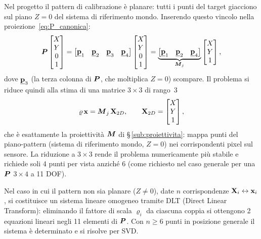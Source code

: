 Nel progetto il pattern di calibrazione è planare: tutti i punti del
target giacciono sul piano \(Z=0\) del sistema di riferimento mondo.
Inserendo questo vincolo nella proiezione~\eqref{eq:P_canonica}:
\[
  \boldsymbol{P}
  \begin{bmatrix} X \\ Y \\ 0 \\ 1 \end{bmatrix}
  =
  \begin{bmatrix} \underline{\mathbf{p}}_1 & \underline{\mathbf{p}}_2 & \underline{\mathbf{p}}_3 & \underline{\mathbf{p}}_4 \end{bmatrix}
  \begin{bmatrix} X \\ Y \\ 0 \\ 1 \end{bmatrix}
  =
  \underbrace{\begin{bmatrix} \underline{\mathbf{p}}_1 & \underline{\mathbf{p}}_2 & \underline{\mathbf{p}}_4 \end{bmatrix}}_{\boldsymbol{M}_j}
  \begin{bmatrix} X \\ Y \\ 1 \end{bmatrix},
\]
dove \(\underline{\mathbf{p}}_3\) (la terza colonna di \(\boldsymbol{P}\), che moltiplica
\(Z=0\)) scompare. Il problema si riduce quindi alla stima di
una matrice \(3\times3\) di rango~3
\[
  \varrho\,\mathbf{x} = \boldsymbol{M}_j\,\mathbf{X}_{2D},
  \qquad
  \mathbf{X}_{2D} = \begin{bmatrix} X \\ Y \\ 1 \end{bmatrix},
\]
che è esattamente la proiettività \(\boldsymbol{M}\) di
\S\,\ref{sub:proiettivita}: mappa punti del piano-pattern
(sistema di riferimento mondo, \(Z=0\)) nei corrispondenti pixel
sul sensore. La riduzione a \(3\times3\) rende il problema
numericamente più stabile e richiede soli 4 punti per vista
anziché 6 (come richiesto nel caso generale per una \(\boldsymbol{P}\)
\(3\times4\) a 11 DOF).

\begin{oss}
Nel caso in cui il pattern non sia planare (\(Z \neq 0\)), date \(n\)
corrispondenze \(\mathbf{X}_i \leftrightarrow \mathbf{x}_i\), si
costituisce un sistema lineare omogeneo tramite DLT
(Direct Linear Transform): eliminando il fattore di scala
\(\varrho_i\) da ciascuna coppia si ottengono 2 equazioni
lineari negli 11 elementi di \(\boldsymbol{P}\). Con \(n \geq 6\) punti
in posizione generale il sistema è determinato e si risolve per SVD.
\end{oss}
